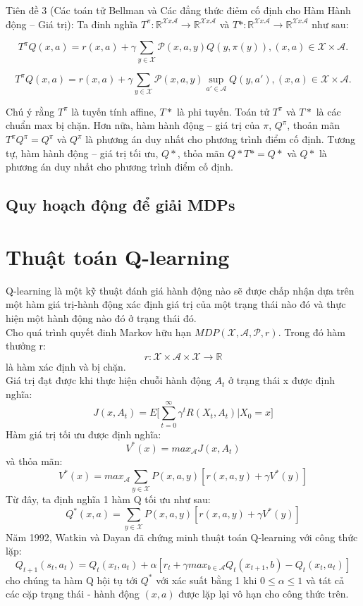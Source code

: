 \documentclass[14pt,a4paper,oneside]{report}		%
\begin{document}
Tiên đề 3 (Các toán tử Bellman và Các đẳng thức điẻm cố định cho Hàm Hành động – Giá trị): Ta đinh nghĩa $T^\pi: \mathbb{R}^{\mathcal{X}x\mathcal{A}}\rightarrow\mathbb{R}^{\mathcal{X}x\mathcal{A}}$ và $T*: \mathbb{R}^{\mathcal{X}x\mathcal{A}}\rightarrow\mathbb{R}^{\mathcal{X}x\mathcal{A}}$ như sau:

\begin{equation} \label{eq14}
T^\pi Q(x,a)= r(x,a) + \gamma \sum_{y\in\mathcal{X}}\mathcal{P}(x,a,y)Q(y,\pi(y)), (x,a)\in\mathcal{X}\times\mathcal{A}.
\end{equation}

\begin{equation} \label{eq15}
T^\pi Q(x,a)= r(x,a) + \gamma \displaystyle\sum_{y\in\mathcal{X}}\mathcal{P}(x,a,y)\sup_{a'\in\mathcal{A}}Q(y,a'), (x,a)\in\mathcal{X}\times\mathcal{A}.
\end{equation}

Chú ý rằng $T^\pi$ là tuyến tính affine, $T*$ là phi tuyến. Toán tử $T^\pi$ và $T*$ là các chuẩn max bị chặn. Hơn nữa, hàm hành động – giá trị của $\pi$, $Q^\pi$, thoản mãn $T^\pi Q^\pi=Q^\pi$ và $Q^\pi$ là phương án duy nhất cho phương trình điểm cố định. Tương tự, hàm hành động – giá trị tối ưu, $Q*$, thỏa mãn $Q*T*=Q*$ và $Q*$ là phương án duy nhất cho phương trình điểm cố định.

\subsection{Quy hoạch động để giải MDPs}

\section{Thuật toán Q-learning}
Q-learning là một kỹ thuật đánh giá hành động nào sẽ được chấp nhận dựa trên một hàm giá trị-hành động xác định giá trị của một trạng thái nào đó và thực hiện một hành động nào đó ở trạng thái đó.\\

Cho quá trình quyết đinh Markov hữu hạn $MDP(\mathcal{X},\mathcal{A},\mathcal{P},r)$. Trong đó hàm thưởng r:
$$r:\mathcal{X}\times\mathcal{A}\times\mathcal{X} \rightarrow \mathbb{R}$$
là hàm xác định và bị chặn.\\

	Giá trị đạt được khi thực hiện chuỗi hành động ${A_t}$ ở trạng thái x được định nghĩa:
$$J(x,{A_t})=E\big[ \sum_{t=0}^\infty{\gamma^t R(X_t,A_t)|X_0=x} \big]$$
Hàm giá trị tối ưu được định nghĩa:
$$V^*(x)=max_{\mathcal{A}}J(x,{A_t})$$ 
và thỏa mãn:
$$V^*(x)=max_{\mathcal{A}}\sum_{y\in\mathcal{X}}{P(x,a,y)[r(x,a,y)+\gamma V^*(y)]}$$
Từ đây, ta định nghĩa 1 hàm Q tối ưu như sau:
$$Q^*(x,a)=\sum_{y\in\mathcal{X}}{P(x,a,y)[r(x,a,y)+\gamma V^*(y)]}$$
Năm 1992, Watkin và Dayan đã chứng minh thuật toán Q-learning với công thức lặp:
\begin{equation} \label{eq16}
Q_{t+1}(s_t,a_t)=Q_t(x_t,a_t)+\alpha[r_t +\gamma max_{b \in \mathcal{A}}Q_t(x_{t+1},b)-Q_t(x_t,a_t)]
\end{equation}
cho chúng ta hàm Q hội tụ tới $Q^*$ với xác suất bằng 1 khi $0 \leq \alpha \leq 1$ và tát cả các cặp trạng thái - hành động $(x,a)$ được lặp lại vô hạn cho công thức trên.\\
 
\end{document}
